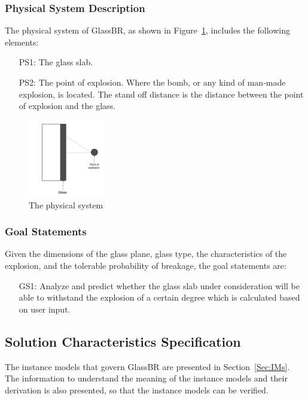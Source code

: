 \documentclass[12pt]{article}
\begin{document}
\subsubsection{Physical System Description}
\label{Sec:PhysSyst}
The physical system of GlassBR, as shown in Figure~\ref{Figure:physSystImage}, includes the following elements:
\begin{itemize}
\item[PS1:]The glass slab.
\item[PS2:]The point of explosion. Where the bomb, or any kind of man-made explosion, is located. The stand off distance is the distance between the point of explosion and the glass.
\end{itemize}
\begin{figure}
\begin{center}
\includegraphics[width=0.3\textwidth]{../../../datafiles/GlassBR/physicalsystimage.png}
\caption{The physical system}
\label{Figure:physSystImage}
\end{center}
\end{figure}
\subsubsection{Goal Statements}
\label{Sec:GoalStmt}
Given the dimensions of the glass plane, glass type, the characteristics of the explosion, and the tolerable probability of breakage, the goal statements are:
\begin{itemize}
\item[GS1:]Analyze and predict whether the glass slab under consideration will be able to withstand the explosion of a certain degree which is calculated based on user input.
\end{itemize}
\subsection{Solution Characteristics Specification}
\label{Sec:SolCharSpec}
The instance models that govern GlassBR are presented in Section~\ref{Sec:IMs}. The information to understand the meaning of the instance models and their derivation is also presented, so that the instance models can be verified.
\end{document}

